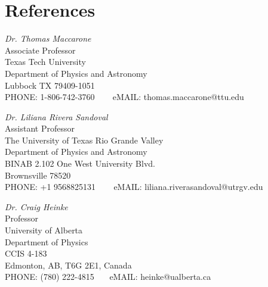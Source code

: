 \documentclass[letterpaper,10pt]{article}
\begin{document}
\pagebreak


\section*{References }  


   \begin{tabbing}
 \emph{Dr. Thomas Maccarone}\\
Associate Professor\\
Texas Tech University \\
Department of Physics and Astronomy \\
Lubbock TX 79409-1051 \\
PHONE:  1-806-742-3760 \,\,\,\,\,\,\,\,\, eMAIL: 
thomas.maccarone@ttu.edu
\end{tabbing}

   \begin{tabbing}
 \emph{Dr. Liliana Rivera Sandoval}\\
Assistant Professor \\
The University of Texas Rio Grande Valley \\
Department of Physics and Astronomy \\
BINAB 2.102 One West University Blvd. \\
Brownsville 78520 \\
PHONE:  +1 9568825131 \,\,\,\,\,\,\,\,\, eMAIL: 
liliana.riverasandoval@utrgv.edu
\end{tabbing}


   \begin{tabbing}
 \emph{Dr. Craig Heinke}\\
Professor \\
University of Alberta \\
Department of Physics \\
 CCIS 4-183 \\
 Edmonton, AB, T6G 2E1, Canada\\
PHONE:  (780) 222-4815\,\,\,\,\,\,\,\,\, eMAIL: 
 heinke@ualberta.ca
\end{tabbing}
\end{document}
